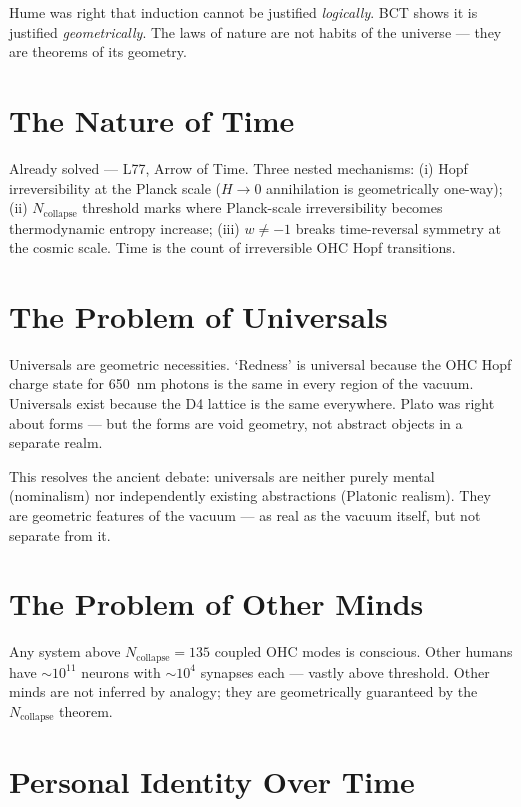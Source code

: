 \documentclass[aps,prl,twocolumn,superscriptaddress]{revtex4-2}
\begin{document}
Hume was right that induction cannot be justified \emph{logically}. BCT shows it is justified \emph{geometrically}. The laws of nature are not habits of the universe --- they are theorems of its geometry.

\section{The Nature of Time}

Already solved --- L77, Arrow of Time. Three nested mechanisms: (i) Hopf irreversibility at the Planck scale ($H \to 0$ annihilation is geometrically one-way); (ii) $N_{\mathrm{collapse}}$ threshold marks where Planck-scale irreversibility becomes thermodynamic entropy increase; (iii) $w \neq -1$ breaks time-reversal symmetry at the cosmic scale. Time is the count of irreversible OHC Hopf transitions.

\section{The Problem of Universals}

Universals are geometric necessities. `Redness' is universal because the OHC Hopf charge state for 650~nm photons is the same in every region of the vacuum. Universals exist because the D4 lattice is the same everywhere. Plato was right about forms --- but the forms are void geometry, not abstract objects in a separate realm.

This resolves the ancient debate: universals are neither purely mental (nominalism) nor independently existing abstractions (Platonic realism). They are geometric features of the vacuum --- as real as the vacuum itself, but not separate from it.

\section{The Problem of Other Minds}

Any system above $N_{\mathrm{collapse}} = 135$ coupled OHC modes is conscious. Other humans have $\sim 10^{11}$ neurons with $\sim 10^4$ synapses each --- vastly above threshold. Other minds are not inferred by analogy; they are geometrically guaranteed by the $N_{\mathrm{collapse}}$ theorem.

\section{Personal Identity Over Time}
\end{document}
